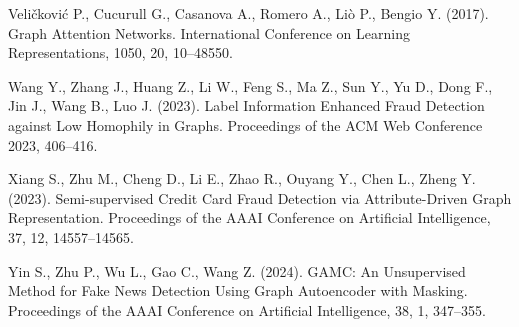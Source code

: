 \documentclass[a4paper,article,14pt]{extarticle}
\begin{document}
\begin{thebibliography}{1}
 Veličković P., Cucurull G., Casanova A., Romero A., Liò P., Bengio Y. (2017). \flqq Graph Attention Networks\frqq. International Conference on Learning Representations, 1050, 20, 10--48550.

 Wang Y., Zhang J., Huang Z., Li W., Feng S., Ma Z., Sun Y., Yu D., Dong F., Jin J., Wang B., Luo J. (2023). \flqq Label Information Enhanced Fraud Detection against Low Homophily in Graphs\frqq. Proceedings of the ACM Web Conference 2023, 406--416.

 Xiang S., Zhu M., Cheng D., Li E., Zhao R., Ouyang Y., Chen L., Zheng Y. (2023). \flqq Semi-supervised Credit Card Fraud Detection via Attribute-Driven Graph Representation\frqq. Proceedings of the AAAI Conference on Artificial Intelligence, 37, 12, 14557--14565.

 Yin S., Zhu P., Wu L., Gao C., Wang Z. (2024). \flqq GAMC: An Unsupervised Method for Fake News Detection Using Graph Autoencoder with Masking\frqq. Proceedings of the AAAI Conference on Artificial Intelligence, 38, 1, 347--355.

\end{thebibliography}
\end{document}
